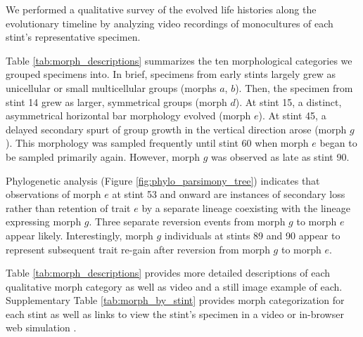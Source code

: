 

We performed a qualitative survey of the evolved life histories along the evolutionary timeline by analyzing video recordings of monocultures of each stint's representative specimen.

Table \ref{tab:morph_descriptions} summarizes the ten morphological categories we grouped specimens into.
In brief, specimens from early stints largely grew as unicellular or small multicellular groups (morphs $a$, $b$).
Then, the specimen from stint 14 grew as larger, symmetrical groups (morph $d$).
At stint 15, a distinct, asymmetrical horizontal bar morphology evolved (morph $e$).
At stint 45, a delayed secondary spurt of group growth in the vertical direction arose (morph $g$).
This morphology was sampled frequently until stint 60 when morph $e$ began to be sampled primarily again.
However, morph $g$ was observed as late as stint 90.

Phylogenetic analysis (Figure \ref{fig:phylo_parsimony_tree}) indicates that observations of morph $e$ at stint 53 and onward are instances of secondary loss rather than retention of trait $e$ by a separate lineage coexisting with the lineage expressing morph $g$.
Three separate reversion events from morph $g$ to morph $e$ appear likely.
Interestingly, morph $g$ individuals at stints 89 and 90 appear to represent subsequent trait re-gain after reversion from morph $g$ to morph $e$.

Table \ref{tab:morph_descriptions} provides more detailed descriptions of each qualitative morph category as well as video and a still image example of each.
Supplementary Table \ref{tab:morph_by_stint} provides morph categorization for each stint as well as links to view the stint's specimen in a video or in-browser web simulation \citep{Moreno_2021}.



